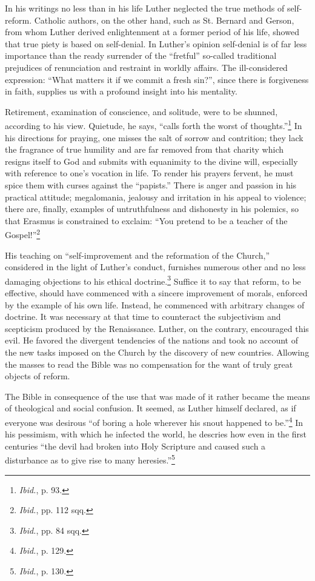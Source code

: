 In his writings no less than in his life Luther neglected the true
methods of self-reform. Catholic authors, on the other hand, such
as St. Bernard and Gerson, from whom Luther derived enlightenment at a
former period of his life, showed that true piety is based on
self-denial. In Luther’s opinion self-denial is of far less importance
than the ready surrender of the “fretful” so-called traditional prejudices
of renunciation and restraint in worldly affairs. The ill-considered expression:
“What matters it if we commit a fresh sin?”, since
there is forgiveness in faith, supplies us with a profound insight into
his mentality.

Retirement, examination of conscience, and solitude, were to be
shunned, according to his view. Quietude, he says, “calls forth the
worst of thoughts.”\footnote{\textit{Ibid.}, p. 93.}
In his directions for praying, one misses the salt
of sorrow and contrition; they lack the fragrance of true humility
and are far removed from that charity which resigns itself to God
and submits with equanimity to the divine will, especially with reference
to one’s vocation in life. To render his prayers fervent, he must
spice them with curses against the “papists.” There is anger and passion
in his practical attitude; megalomania, jealousy and irritation in
his appeal to violence; there are, finally, examples of untruthfulness
and dishonesty in his polemics, so that Erasmus is constrained to exclaim:
“You pretend to be a teacher of the Gospel!”\footnote{\textit{Ibid.}, pp. 112 sqq.}

His teaching on “self-improvement and the reformation of the
Church,” considered in the light of Luther’s conduct, furnishes numerous
other and no less damaging objections to his ethical doctrine.\footnote{\textit{Ibid.}, pp. 84 sqq.}
Suffice it to say that reform, to be effective, should have commenced
with a sincere improvement of morals, enforced by the example of
his own life. Instead, he commenced with arbitrary changes of doctrine.
It was necessary at that time to counteract the subjectivism
and scepticism produced by the Renaissance. Luther, on the contrary,
encouraged this evil. He favored the divergent tendencies of the
nations and took no account of the new tasks imposed on the Church
by the discovery of new countries. Allowing the masses to read the
Bible was no compensation for the want of truly great objects of
reform.

The Bible in consequence of the use that was made of it rather became the
means of theological and social confusion. It seemed, as
Luther himself declared, as if everyone was desirous “of boring a hole
wherever his snout happened to be.”\footnote{\textit{Ibid.}, p. 129.}
In his pessimism, with which
he infected the world, he descries how even in the first centuries “the
devil had broken into Holy Scripture and caused such a disturbance
as to give rise to many heresies.”\footnote{\textit{Ibid.}, p. 130.}

